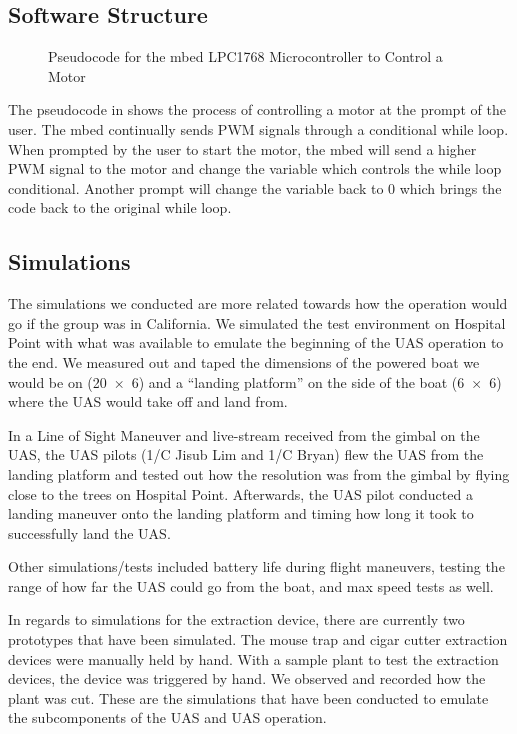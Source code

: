 \documentclass{wrcecapstone}
\begin{document}
\subsection{Software Structure}
\begin{figure}

\caption{Pseudocode for the mbed LPC1768 Microcontroller to Control a Motor}
\label{fig:7.6.1}
\end{figure}

The pseudocode in  shows the process of controlling a motor at the prompt of the user. The mbed continually sends PWM signals through a conditional while loop. When prompted by the user to start the motor, the mbed will send a higher PWM signal to the motor and change the variable which controls the while loop conditional. Another prompt will change the variable back to 0 which brings the code back to the original while loop.




\subsection{Simulations}

The simulations we conducted are more related towards how the operation would go if the group was in California. We simulated the test environment on Hospital Point with what was available to emulate the beginning of the UAS operation to the end. We measured out and taped the dimensions of the powered boat we would be on (\SI{20 x 6}{\foot}) and a ``landing platform'' on the side of the boat (\SI{6 x 6}{\foot}) where the UAS would take off and land from. 

In a Line of Sight Maneuver and live-stream received from the gimbal on the UAS, the UAS pilots (1/C Jisub Lim and 1/C Bryan) flew the UAS from the landing platform and tested out how the resolution was from the gimbal by flying close to the trees on Hospital Point. Afterwards, the UAS pilot conducted a landing maneuver onto the landing platform and timing how long it took to successfully land the UAS.

Other simulations/tests included battery life during flight maneuvers, testing the range of how far the UAS could go from the boat, and max speed tests as well. 

In regards to simulations for the extraction device, there are currently two prototypes that have been simulated. The mouse trap and cigar cutter extraction devices were manually held by hand. With a sample plant to test the extraction devices, the device was triggered by hand. We observed and recorded how the plant was cut. These are the simulations that have been conducted to emulate the subcomponents of the UAS and UAS operation. 
\end{document}

